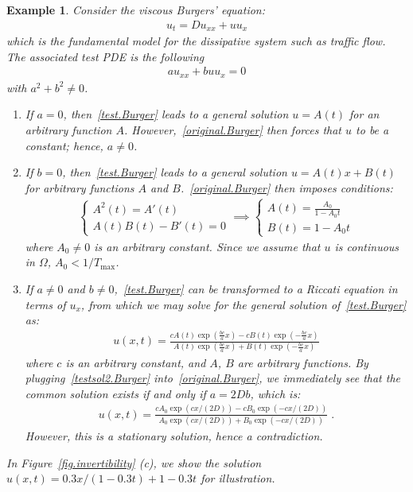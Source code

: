 \documentclass[a4paper,11pt]{article}
\newtheorem{example}{Example}[section]
\begin{document}
\begin{example}
Consider the viscous Burgers' equation:
\begin{align}
u_t=Du_{xx}+uu_x\label{original.Burger}	
\end{align}
which is the fundamental model for the dissipative system such as traffic flow. The associated test PDE is the following 
\begin{align}
au_{xx}+buu_{x}=0\label{test.Burger}	
\end{align}
with $a^2+b^2\neq 0$.
\begin{enumerate}
\item If $a = 0$, then~\eqref{test.Burger} leads to a general solution $u=A(t)$ for an arbitrary function $A$. However,~\eqref{original.Burger} then forces that $u$ to be a constant; hence, $a\neq 0$.
\item If $b = 0$, then~\eqref{test.Burger} leads to a general solution $u=A(t)x+B(t)$ for  arbitrary functions $A$  and $B$.~\eqref{original.Burger} then imposes conditions:
\begin{align}
\begin{cases}
A^2(t)=A'(t)\\
A(t)B(t)-B'(t)=0
\end{cases}	\implies\begin{cases}
A(t)=\frac{A_0}{1-A_0t}\\
B(t)=1-A_0t
\end{cases}
\end{align}
where $A_0\neq 0$ is an arbitrary constant. Since we assume that $u$ is continuous in $\Omega$, $A_0<1/T_{\max}$.   
\item If $a\neq 0$ and $b\neq 0$,~\eqref{test.Burger} can be transformed to a Riccati equation in terms of $u_x$, from which we may solve for the general solution of~\eqref{test.Burger} as:
\begin{align}
u(x,t)=	\frac{cA(t)\exp(\frac{bc}{a}x)-cB(t)\exp(-\frac{bc}{a}x)}{A(t)\exp(\frac{bc}{a}x)+B(t)\exp(-\frac{bc}{a}x)}\label{testsol2.Burger}
\end{align}
where $c$ is an arbitrary constant, and $A$, $B$ are arbitrary functions. By plugging~\eqref{testsol2.Burger} into~\eqref{original.Burger}, we immediately see that the common solution exists if and only if $a=2Db$, which is:
\begin{align}
u(x,t) = \frac{cA_0\exp(cx/(2D))-cB_0\exp(-cx/(2D))}{A_0\exp(cx/(2D))+B_0\exp(-cx/(2D))}\;.	
\end{align}
However, this is a stationary solution, hence a contradiction.
\end{enumerate}
In Figure~\ref{fig.invertibility} (c), we show the solution $u(x,t)=0.3x/(1-0.3t)+1-0.3t$ for illustration.
\end{example}
\end{document}
